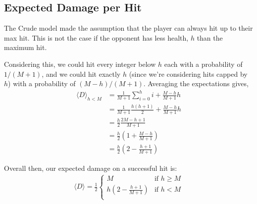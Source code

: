 			\subsection{Expected Damage per Hit}
				The Crude model made the assumption that the player can always hit up to their max hit. This is not the case if the opponent has less health, $h$ than the maximum hit.
				\begin{center}
				\end{center}
				Considering this, we could hit every integer below $h$ each with a probability of $1/(M+1)$, and we could hit exactly $h$ (since we're considering hits capped by $h$) with a probability of $(M-h)/(M+1)$. Averaging the expectations gives,
				\begin{align}
					\langle D \rangle_{h < M} &= \frac{1}{M+1}\sum_{i=0}^{h} i + \frac{M-h}{M+1}h \\
					&= \frac{1}{M+1}\frac{h(h+1)}{2} + \frac{M-h}{M+1}h \\
					&= \frac{h}{2}\frac{2M-h+1}{M+1}\\
					&= \frac{h}{2}\left(1 + \frac{M - h}{M+1}\right)\\
					&= \frac{h}{2}\left(2 - \frac{h + 1}{M+1}\right)
				\end{align}

				Overall then, our expected damage on a successful hit is:
				\begin{align}
					\boxed{
						\langle D \rangle = \frac{1}{2}\begin{cases}
							M &\text{if $h \ge M$} \\
							h\left(2 - \frac{h + 1}{M+1}\right) &\text{if $h < M$} \\
						\end{cases}
					}
				\end{align}

